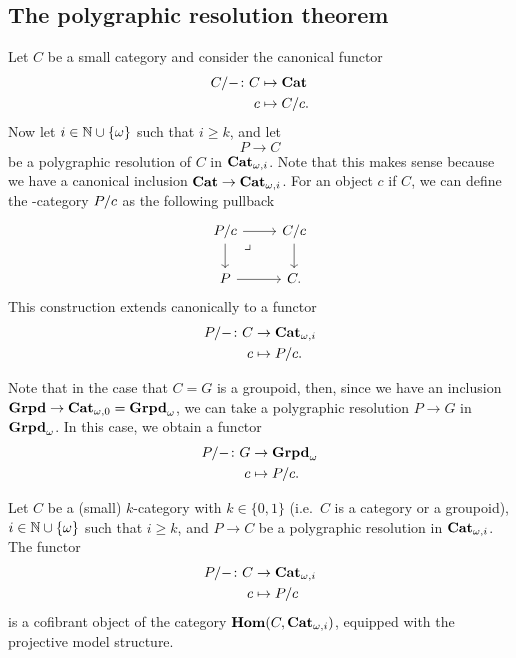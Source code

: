 \subsection{The polygraphic resolution theorem}
\begin{paragr}
  Let $C$ be a small category and consider the canonical functor
  \[
    \begin{aligned}
      C/- \colon C &\mapsto \mathbf{Cat} \\
      c &\mapsto C/c.
    \end{aligned}
  \]
  Now let $i \in \mathbb N\cup\{\omega\}$ such that $i \geq k$, and let
  \[
    P \to C
  \]
  be a polygraphic resolution of $C$ in $\mathbf{Cat}_{\omega,i}$. Note that this
  makes sense because we have a canonical inclusion $\mathbf{Cat} \to
  \mathbf{Cat}_{\omega,i}$. For an object $c$
  if $C$, we can define the \nbd-category $P/c$
  as the following pullback
  \[
    \begin{tikzcd}
      \tr{P}{c} \ar[d] \ar[r] & \tr{C}{c} \ar[d] \\
      P \ar[r] & C.
      \ar[from=1-1,to=2-2,phantom,"\lrcorner",very near start]
    \end{tikzcd}
  \]
  This construction extends canonically to a functor
  \[
    \begin{aligned}
      P/- \colon C &\to \mathbf{Cat}_{\omega,i} \\
      c &\mapsto P/c.
    \end{aligned}
  \]


  Note that in the case that $C=G$ is a groupoid, then, since we have
  an inclusion $\mathbf{Grpd} \to \mathbf{Cat}_{\omega,0}=\mathbf{Grpd}_{\omega}$, we can take a polygraphic
  resolution $P \to G$  in $\mathbf{Grpd}_{\omega}$. In this case, we obtain a functor
  \[
       \begin{aligned}
      P/- \colon G &\to \mathbf{Grpd}_{\omega} \\
      c &\mapsto P/c.
    \end{aligned} 
  \]
\end{paragr}
\begin{theorem}\label{thm:projresol}
  Let $C$ be a (small) $k$\nbd-category with $k \in \{0,1\}$ (i.e.\
  $C$ is a category or a groupoid),  $i \in \mathbb N\cup\{\omega\}$ such that
  $i \geq k$, and $P \to C$ be a polygraphic
  resolution in $\mathbf{Cat}_{\omega,i}$. The functor
    \[
    \begin{aligned}
      P/- \colon C &\to  \mathbf{Cat}_{\omega,i}\\
      c &\mapsto P/c
    \end{aligned}
  \]
  is a cofibrant object of the category
  $\mathbf{Hom}(C,\mathbf{Cat}_{\omega,i})$, equipped with the projective model structure.
\end{theorem}
